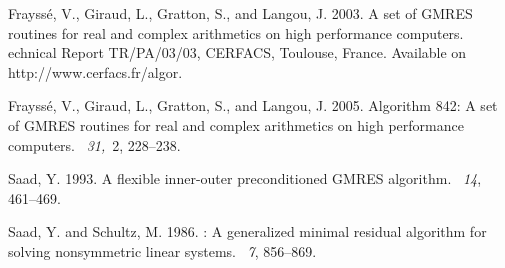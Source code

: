 \documentclass{acmtrans2m}
\begin{document}

%
%

%

\begin{thebibliography}{}

{\sc Frayss\'e, V.}, {\sc Giraud, L.}, {\sc Gratton, S.}, {\sc and} {\sc
  Langou, J.} 2003.
\newblock A set of {GMRES} routines for real and complex arithmetics on high
  performance computers.
echnical {R}eport TR/PA/03/03, CERFACS, Toulouse, France.
\newblock Available on http://www.cerfacs.fr/algor.

{\sc Frayss\'e, V.}, {\sc Giraud, L.}, {\sc Gratton, S.}, {\sc and} {\sc
  Langou, J.} 2005.
\newblock Algorithm 842: A set of {GMRES} routines for real and complex
  arithmetics on high performance computers.
~{\em 31,\/}~2, 228--238.

{\sc Saad, Y.} 1993.
\newblock A flexible inner-outer preconditioned {GMRES} algorithm.
~{\em 14}, 461--469.

{\sc Saad, Y.} {\sc and} {\sc Schultz, M.} 1986.
: A generalized minimal residual algorithm for solving
  nonsymmetric linear systems.
~{\em 7}, 856--869.

\end{thebibliography}
%
\end{document}

